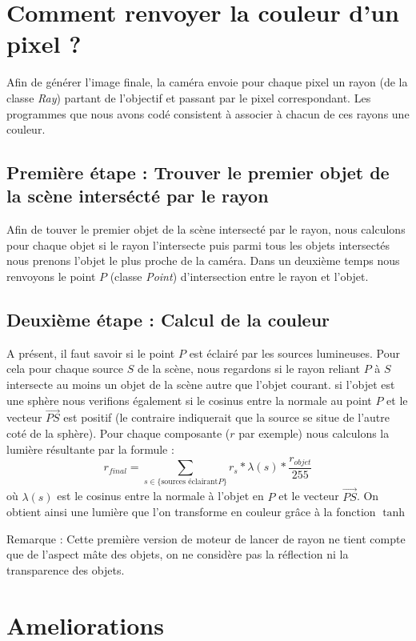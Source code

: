 \documentclass{article}
\begin{document}
\section{Comment renvoyer la couleur d'un pixel ?}
Afin de générer l'image finale, la caméra envoie pour chaque pixel un rayon (de la classe \emph{Ray}) partant de l'objectif et passant par le pixel correspondant. Les programmes que nous avons codé consistent à associer à chacun de ces rayons une couleur.

\subsection{Première étape : Trouver le premier objet de la scène intersécté par le rayon}
Afin de touver le premier objet de la scène intersecté par le rayon, nous calculons pour chaque objet si le rayon l'intersecte puis parmi tous les objets intersectés nous prenons l'objet le plus proche de la caméra. Dans un deuxième temps nous renvoyons le point $P$ (classe \emph{Point}) d'intersection entre le rayon et l'objet.

\subsection{Deuxième étape : Calcul de la couleur}
A présent, il faut savoir si le point $P$ est éclairé par les sources lumineuses. Pour cela pour chaque source $S$ de la scène, nous regardons si le rayon reliant $P$ à $S$ intersecte au moins un objet de la scène autre que l'objet courant. si l'objet est une sphère nous verifions également si le cosinus entre la normale au point $P$ et le vecteur $\overrightarrow{PS}$ est positif (le contraire indiquerait que la source se situe de l'autre coté de la sphère).
Pour chaque composante ($r$ par exemple) nous calculons la lumière résultante par la formule : 
\begin{equation}
	r_{final} = \sum_{s \in \{ \text{sources éclairant} P \}} r_s*\lambda(s)*\frac{r_{objet}}{255}
\end{equation}
où $\lambda(s)$ est le cosinus entre la normale à l'objet en $P$ et le vecteur $\overrightarrow{PS}$. 
On obtient ainsi une lumière que l'on transforme en couleur grâce à la fonction $\tanh$

Remarque : Cette première version de moteur de lancer de rayon ne tient compte que de l'aspect mâte des objets, on ne considère pas la réflection ni la transparence des objets.

\section{Ameliorations}
\end{document}

